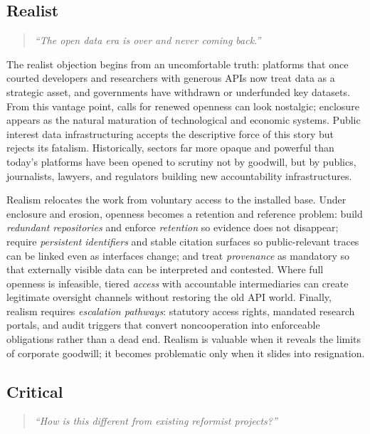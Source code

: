 \documentclass[acmsmall,screen]{acmart}
\begin{document}
\subsection*{Realist}
\begin{quote}\centering
\textit{``The open data era is over and never coming back.''}
\end{quote}

\noindent The realist objection begins from an uncomfortable truth: platforms that once courted developers and researchers with generous APIs now treat data as a strategic asset, and governments have withdrawn or underfunded key datasets. From this vantage point, calls for renewed openness can look nostalgic; enclosure appears as the natural maturation of technological and economic systems. Public interest data infrastructuring accepts the descriptive force of this story but rejects its fatalism. Historically, sectors far more opaque and powerful than today's platforms have been opened to scrutiny not by goodwill, but by publics, journalists, lawyers, and regulators building new accountability infrastructures.

Realism relocates the work from voluntary access to the installed base. Under enclosure and erosion, openness becomes a retention and reference problem: build \emph{redundant repositories} and enforce \emph{retention} so evidence does not disappear; require \emph{persistent identifiers} and stable citation surfaces so public-relevant traces can be linked even as interfaces change; and treat \emph{provenance} as mandatory so that externally visible data can be interpreted and contested. Where full openness is infeasible, tiered \emph{access} with accountable intermediaries can create legitimate oversight channels without restoring the old API world. Finally, realism requires \emph{escalation pathways}: statutory access rights, mandated research portals, and audit triggers that convert noncooperation into enforceable obligations rather than a dead end. Realism is valuable when it reveals the limits of corporate goodwill; it becomes problematic only when it slides into resignation.

\subsection*{Critical}
\begin{quote}\centering
\textit{``How is this different from existing reformist projects?''}
\end{quote}
\end{document}
